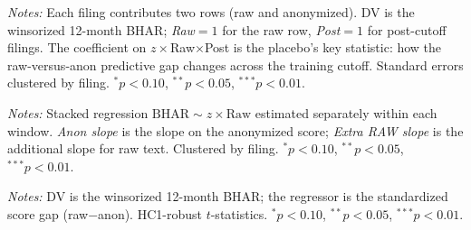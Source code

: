 \documentclass[12pt]{article}
\begin{document}
\begin{table}[htbp]\centering
\begin{threeparttable}
\caption{Stacked triple-interaction test}\label{tab:interaction}\small

\begin{tablenotes}\small\item \textit{Notes:} Each filing contributes two rows (raw and
anonymized). DV is the winsorized 12-month BHAR; \emph{Raw}$=1$ for the raw row,
\emph{Post}$=1$ for post-cutoff filings. The coefficient on $z\times$Raw$\times$Post is the
placebo's key statistic: how the raw-versus-anon predictive gap changes across the training
cutoff. Standard errors clustered by filing. $^{*}p<0.10$, $^{**}p<0.05$, $^{***}p<0.01$.
\end{tablenotes}
\end{threeparttable}
\end{table}

\begin{table}[htbp]\centering
\begin{threeparttable}
\caption{Within-window raw-versus-anon slope gap}\label{tab:within}\small

\begin{tablenotes}\small\item \textit{Notes:} Stacked regression $\text{BHAR}\sim z\times
\text{Raw}$ estimated separately within each window. \emph{Anon slope} is the slope on the
anonymized score; \emph{Extra RAW slope} is the additional slope for raw text. Clustered by
filing. $^{*}p<0.10$, $^{**}p<0.05$, $^{***}p<0.01$.
\end{tablenotes}
\end{threeparttable}
\end{table}

\begin{table}[htbp]\centering
\begin{threeparttable}
\caption{Does the raw$-$anon score gap predict returns?}\label{tab:gap}\small

\begin{tablenotes}\small\item \textit{Notes:} DV is the winsorized 12-month BHAR; the
regressor is the standardized score gap (raw$-$anon). HC1-robust $t$-statistics.
$^{*}p<0.10$, $^{**}p<0.05$, $^{***}p<0.01$.
\end{tablenotes}
\end{threeparttable}
\end{table}
\end{document}
